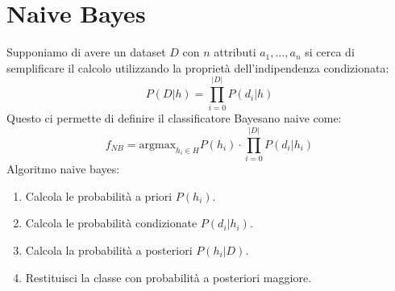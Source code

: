 \section{Naive Bayes}
Supponiamo di avere un dataset $D$ con $n$ attributi $a_1, \dots, a_n$ si cerca
di semplificare il calcolo utilizzando la proprietà dell'indipendenza condizionata:
\begin{equation}
    P(D|h) = \prod_{i = 0}^{|D|} P(d_i|h)
\end{equation}
Questo ci permette di definire il classificatore Bayesano naive come:
\begin{equation}
    f_{NB} = \text{argmax}_{h_i \in H} P(h_i) \cdot \prod_{i = 0}^{|D|} P(d_i|h_i)
\end{equation}
Algoritmo naive bayes:
\begin{enumerate}
    \item Calcola le probabilità a priori $P(h_i)$.
    \item Calcola le probabilità condizionate $P(d_i|h_i)$.
    \item Calcola la probabilità a posteriori $P(h_i|D)$.
    \item Restituisci la classe con probabilità a posteriori maggiore.
\end{enumerate}
